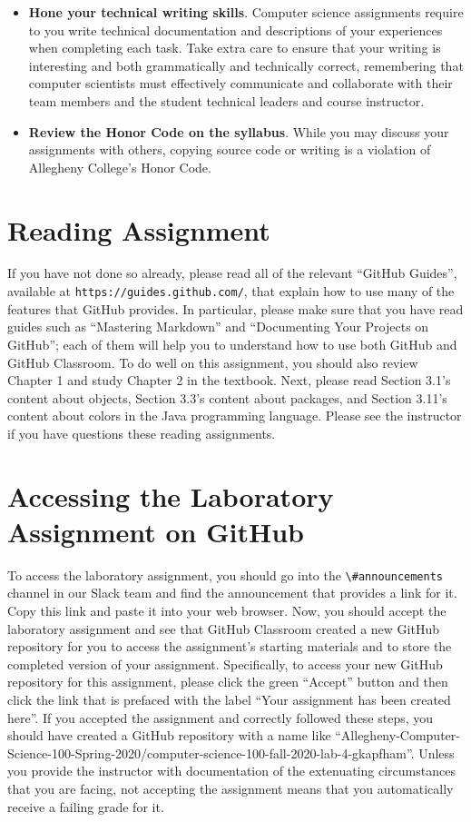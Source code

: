 \documentclass[11pt]{article}
\newcommand{\url}[1]{\lstinline{#1}}
\newcommand{\channel}[1]{\lstinline{#1}}
\begin{document}
\begin{itemize}
\item {\bf Hone your technical writing skills}. Computer science assignments
  require to you write technical documentation and descriptions of your
  experiences when completing each task. Take extra care to ensure that your
  writing is interesting and both grammatically and technically correct,
  remembering that computer scientists must effectively communicate and
  collaborate with their team members and the student technical leaders and
  course instructor.

\item {\bf Review the Honor Code on the syllabus}. While you may discuss your
  assignments with others, copying source code or writing is a violation of
  Allegheny College's Honor Code.

\end{itemize}

\section*{Reading Assignment}

If you have not done so already, please read all of the relevant ``GitHub
Guides'', available at \url{https://guides.github.com/}, that explain how to use
many of the features that GitHub provides. In particular, please make sure that
you have read guides such as ``Mastering Markdown'' and ``Documenting Your
Projects on GitHub''; each of them will help you to understand how to use both
GitHub and GitHub Classroom. To do well on this assignment, you should also
review Chapter 1 and study Chapter 2 in the textbook. Next, please read Section
3.1's content about objects, Section 3.3's content about packages, and Section
3.11's content about colors in the Java programming language.
%
Please see the instructor if you have questions these reading assignments.

\section*{Accessing the Laboratory Assignment on GitHub}

To access the laboratory assignment, you should go into the
\channel{\#announcements} channel in our Slack team and find the announcement
that provides a link for it. Copy this link and paste it into your web browser.
Now, you should accept the laboratory assignment and see that GitHub Classroom
created a new GitHub repository for you to access the assignment's starting
materials and to store the completed version of your assignment. Specifically,
to access your new GitHub repository for this assignment, please click the green
``Accept'' button and then click the link that is prefaced with the label ``Your
assignment has been created here''. If you accepted the assignment and correctly
followed these steps, you should have created a GitHub repository with a name
like
``Allegheny-Computer-Science-100-Spring-2020/computer-science-100-fall-2020-lab-4-gkapfham''.
Unless you provide the instructor with documentation of the extenuating
circumstances that you are facing, not accepting the assignment means that you
automatically receive a failing grade for it.
\end{document}
